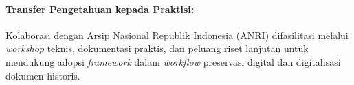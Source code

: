 \documentclass[12pt,a4paper]{article}
\begin{document}
\paragraph{Transfer Pengetahuan kepada Praktisi:}
Kolaborasi dengan Arsip Nasional Republik Indonesia (ANRI) difasilitasi melalui \textit{workshop} teknis, dokumentasi praktis, dan peluang riset lanjutan untuk mendukung adopsi \textit{framework} dalam \textit{workflow} preservasi digital dan digitalisasi dokumen historis.


% 


\end{document}
